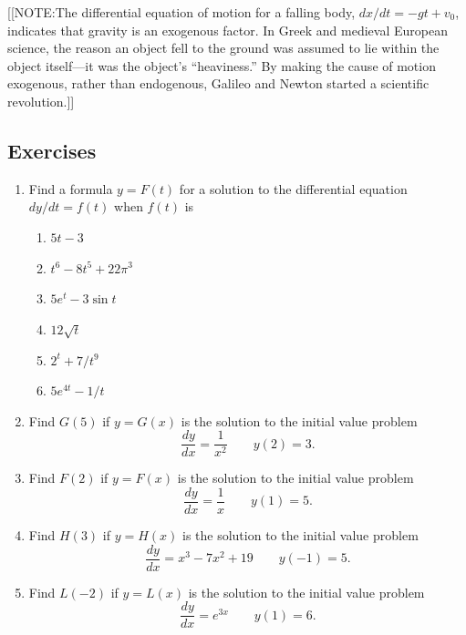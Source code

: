 [[NOTE:The differential equation of motion for a falling body, $dx/dt
  = -gt + v_0$, indicates that gravity is an exogenous factor.  In
  Greek and medieval European science, the reason an object fell to
  the ground was assumed to lie within the object itself---it was the
  object's ``heaviness.''  By making the cause of motion exogenous,
  rather than endogenous, Galileo and Newton started a scientific
  revolution.]]

\subsection{Exercises}
\label{subsec:exercises}



\begin{enumerate}
\item Find a formula $y = F(t)$ for a solution to the differential equation $dy/dt = f(t)$ when $f(t)$ is




  \begin{enumerate}
  \item $5t - 3$


  \item $t^6 - 8t^5 + 22\pi^3$


  \item $5e^t - 3\sin{t}$


  \item $12\sqrt{t}$


  \item $2^t + 7/t^9$

  \item $5e^{4t}-1/t$


\end{enumerate}
\item Find $G(5)$ if $y = G(x)$ is the solution to the initial value problem
        \[
\dfrac{dy}{dx} = \dfrac{1}{x^2} \qquad y(2) = 3.
\]


\item Find $F(2)$ if $y = F(x)$ is the solution to the initial value problem
        \[
\dfrac{dy}{dx} = \dfrac{1}{x} \qquad y(1) = 5.
\]


\item Find $H(3)$ if $y = H(x)$ is the solution to the initial value problem
        \[
\dfrac{dy}{dx} = x^3-7x^2+19 \qquad y(-1) = 5.
\]


\item Find $L(-2)$ if $y = L(x)$ is the solution to the initial value problem
        \[
\dfrac{dy}{dx} = e^{3x} \qquad y(1) = 6.
\]



\end{enumerate}
